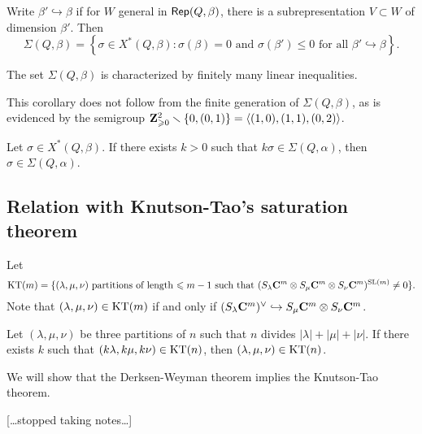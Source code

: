 \documentclass{article}
\begin{document}
\begin{theorem}
Write $\beta'\hookrightarrow \beta$ if for $W$ general in 
$\operatorname{\mathsf{Rep}}(Q,\beta)$, there is a subrepresentation 
$V\subset W$ of dimension $\beta'$. Then 
\[
  \Sigma(Q,\beta) = \left\{\sigma\in X^\ast(Q,\beta):\sigma(\beta)=0\text{ and }\sigma(\beta')\leqslant 0\text{ for all }\beta'\hookrightarrow \beta\right\} .
\]
\end{theorem}

\begin{corollary}
The set $\Sigma(Q,\beta)$ is characterized by finitely many linear inequalities. 
\end{corollary}

This corollary does not follow from the finite generation of $\Sigma(Q,\beta)$, 
as is evidenced by the semigroup 
$\mathbf{Z}_{\geqslant 0}^2 \smallsetminus \{0,(0,1)\} = \langle (1,0),(1,1),(0,2)\rangle$. 

\begin{corollary}
Let $\sigma \in X^\ast(Q,\beta)$. If there exists $k>0$ such that 
$k\sigma\in \Sigma(Q,\alpha)$, then $\sigma\in \Sigma(Q,\alpha)$. 
\end{corollary}


\subsection{Relation with Knutson-Tao's saturation theorem}

Let 
\[
  \operatorname{KT}(m) = \{(\lambda,\mu,\nu)\text{ partitions of length $\leqslant m-1$ such that }(S_\lambda \mathbf{C}^m \otimes S_\mu \mathbf{C}^m \otimes S_\nu \mathbf{C}^m)^{\operatorname{SL}(m)}\ne 0\} .
\]
Note that $(\lambda,\mu,\nu)\in \operatorname{KT}(m)$ if and only if 
$(S_\lambda\mathbf{C}^m)^\vee\hookrightarrow S_\mu \mathbf{C}^m\otimes S_\nu \mathbf{C}^m$. 

\begin{theorem}
Let $(\lambda,\mu,\nu)$ be three partitions of $n$ such that 
$n$ divides $|\lambda|+|\mu|+|\nu|$. If there exists $k$ such that 
$(k\lambda,k\mu,k\nu)\in \operatorname{KT}(n)$, then $(\lambda,\mu,\nu)\in \operatorname{KT}(n)$. 
\end{theorem}

We will show that the Derksen-Weyman theorem implies the Knutson-Tao theorem. 

[\ldots stopped taking notes\ldots]
\end{document}
